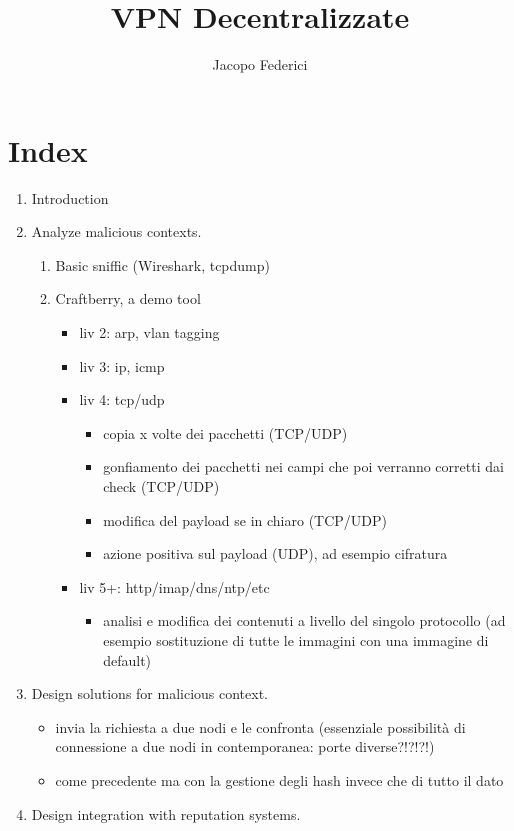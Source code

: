 \documentclass[]{article}
\title{VPN Decentralizzate}
\author{Jacopo Federici}
\begin{document}
	
	\maketitle
	
	\begin{abstract}
		
	\end{abstract}
	
	\section{Index}
	
	\begin{enumerate}
			\item Introduction
			\item Analyze malicious contexts.
				\begin{enumerate}
					\item Basic sniffic (Wireshark, tcpdump)
					\item Craftberry, a demo tool
					\begin{itemize}
						\item liv 2: arp, vlan tagging
						\item liv 3: ip, icmp
						\item liv 4: tcp/udp
						\begin{itemize}
							\item copia x volte dei pacchetti (TCP/UDP)
							\item gonfiamento dei pacchetti nei campi che poi verranno corretti dai check (TCP/UDP)
							\item modifica del payload se in chiaro (TCP/UDP)
							\item azione positiva sul payload (UDP), ad esempio cifratura
						\end{itemize}
						\item liv 5+: http/imap/dns/ntp/etc
						\begin{itemize}
							\item analisi e modifica dei contenuti a livello del singolo protocollo (ad esempio sostituzione di tutte le immagini con una immagine di default)
						\end{itemize}
					\end{itemize}	
				\end{enumerate}
			\item Design solutions for malicious context.
				\begin{itemize}
					\item invia la richiesta a due nodi e le confronta (essenziale possibilità di connessione a due nodi in contemporanea: porte diverse?!?!?!)
					\item come precedente ma con la gestione degli hash invece che di tutto il dato
				\end{itemize}
			\item Design integration with reputation systems.
			
	\end{enumerate}
	
\end{document}
